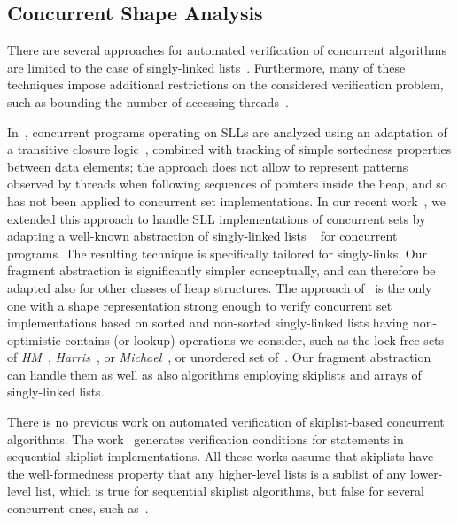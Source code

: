 \subsection{Concurrent Shape Analysis}
There are several approaches for automated verification of concurrent algorithms are limited to the
case of singly-linked
lists~\cite{AHHR:integrated,meyer:vmcai16,Quy:sas16,Sagiv:correlation,Vafeiadis:cav10}.
Furthermore, many of these techniques impose additional restrictions on the considered verification problem, such as bounding the number of accessing
threads~\cite{Amit:comparisonAbstraction,Vechev:spin09,CernyRZCA:CAV10}.

In~\cite{AHHR:integrated}, concurrent programs operating on SLLs are analyzed
using an adaptation of a transitive closure logic~\cite{BiRa:vmcai06}, combined with
tracking of simple sortedness properties between data elements; the approach does
not allow to represent patterns observed by threads when following sequences of
pointers inside the heap, and so has not been applied to concurrent set
implementations.
In our recent work~\cite{Quy:sas16}, we extended this approach to handle SLL implementations
of concurrent sets by adapting a
well-known abstraction of singly-linked lists ~\cite{MYRS:Canonical} for concurrent programs.
The resulting technique is specifically tailored for singly-links.
Our fragment abstraction is significantly simpler conceptually, and can therefore be  adapted
also for other classes of heap structures.
The approach of~\cite{Quy:sas16} is the only one with a shape representation strong enough to
verify  concurrent set
implementations based on sorted and non-sorted
singly-linked lists having non-optimistic contains (or lookup) operations we consider, such as
the lock-free sets of {\it HM}~\cite{ArtOfMpP},
{\it Harris}~\cite{Harris:list}, or {\it Michael}~\cite{Michael:list},
or unordered set of~\cite{Zhang:unorderedlist}. Our fragment abstraction can handle them
as well as also algorithms employing skiplists and arrays of singly-linked lists.

There is no previous work on automated verification of skiplist-based concurrent algorithms. The work~\cite{Sanchez:skiplists}
generates verification conditions for statements in sequential skiplist implementations. All these
works assume that skiplists have the well-formedness property that any higher-level lists is a
sublist of any lower-level list, which is true for sequential skiplist algorithms, but false for
several concurrent ones, such as~\cite{ArtOfMpP,Linden:opodis13}.



